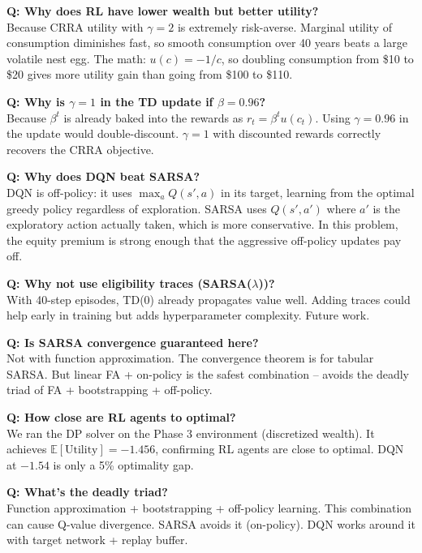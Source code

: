 \documentclass[11pt, letterpaper]{article}
\begin{document}
\textbf{Q: Why does RL have lower wealth but better utility?}\\
Because CRRA utility with $\gamma=2$ is extremely risk-averse. Marginal utility of consumption diminishes fast, so smooth consumption over 40 years beats a large volatile nest egg. The math: $u(c) = -1/c$, so doubling consumption from \$10 to \$20 gives more utility gain than going from \$100 to \$110.

\textbf{Q: Why is $\gamma=1$ in the TD update if $\beta=0.96$?}\\
Because $\beta^t$ is already baked into the rewards as $r_t = \beta^t u(c_t)$. Using $\gamma=0.96$ in the update would double-discount. $\gamma=1$ with discounted rewards correctly recovers the CRRA objective.

\textbf{Q: Why does DQN beat SARSA?}\\
DQN is off-policy: it uses $\max_a Q(s',a)$ in its target, learning from the optimal greedy policy regardless of exploration. SARSA uses $Q(s', a')$ where $a'$ is the exploratory action actually taken, which is more conservative. In this problem, the equity premium is strong enough that the aggressive off-policy updates pay off.

\textbf{Q: Why not use eligibility traces (SARSA($\lambda$))?}\\
With 40-step episodes, TD(0) already propagates value well. Adding traces could help early in training but adds hyperparameter complexity. Future work.

\textbf{Q: Is SARSA convergence guaranteed here?}\\
Not with function approximation. The convergence theorem is for tabular SARSA. But linear FA + on-policy is the safest combination -- avoids the deadly triad of FA + bootstrapping + off-policy.

\textbf{Q: How close are RL agents to optimal?}\\
We ran the DP solver on the Phase 3 environment (discretized wealth). It achieves $\mathbb{E}[\text{Utility}] = -1.456$, confirming RL agents are close to optimal. DQN at $-1.54$ is only a 5\% optimality gap.

\textbf{Q: What's the deadly triad?}\\
Function approximation + bootstrapping + off-policy learning. This combination can cause Q-value divergence. SARSA avoids it (on-policy). DQN works around it with target network + replay buffer.
\end{document}
